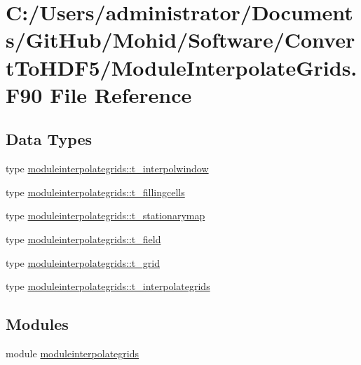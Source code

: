 \hypertarget{_module_interpolate_grids_8_f90}{}\section{C\+:/\+Users/administrator/\+Documents/\+Git\+Hub/\+Mohid/\+Software/\+Convert\+To\+H\+D\+F5/\+Module\+Interpolate\+Grids.F90 File Reference}
\label{_module_interpolate_grids_8_f90}
\subsection*{Data Types}
\begin{DoxyCompactItemize}
\item 
type \mbox{\hyperlink{structmoduleinterpolategrids_1_1t__interpolwindow}{moduleinterpolategrids\+::t\+\_\+interpolwindow}}
\item 
type \mbox{\hyperlink{structmoduleinterpolategrids_1_1t__fillingcells}{moduleinterpolategrids\+::t\+\_\+fillingcells}}
\item 
type \mbox{\hyperlink{structmoduleinterpolategrids_1_1t__stationarymap}{moduleinterpolategrids\+::t\+\_\+stationarymap}}
\item 
type \mbox{\hyperlink{structmoduleinterpolategrids_1_1t__field}{moduleinterpolategrids\+::t\+\_\+field}}
\item 
type \mbox{\hyperlink{structmoduleinterpolategrids_1_1t__grid}{moduleinterpolategrids\+::t\+\_\+grid}}
\item 
type \mbox{\hyperlink{structmoduleinterpolategrids_1_1t__interpolategrids}{moduleinterpolategrids\+::t\+\_\+interpolategrids}}
\end{DoxyCompactItemize}
\subsection*{Modules}
\begin{DoxyCompactItemize}
\item 
module \mbox{\hyperlink{namespacemoduleinterpolategrids}{moduleinterpolategrids}}
\end{DoxyCompactItemize}
